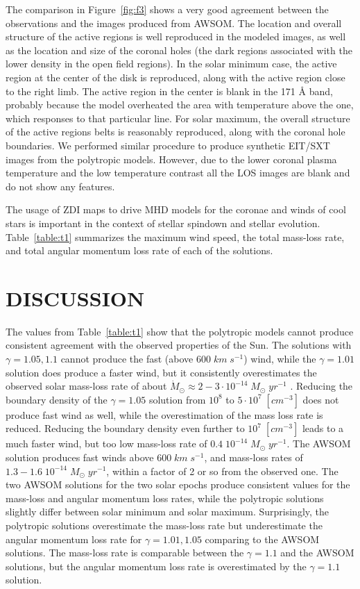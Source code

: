 \documentclass[apj]{emulateapj}
\begin{document}
The comparison in Figure~\ref{fig:f3} shows a very good agreement between the observations and the images produced from AWSOM. The location and overall structure of the active regions is well reproduced in the modeled images, as well as the location and size of the coronal holes (the dark regions associated with the lower density in the open field regions). In the solar minimum case, the active region at the center of the disk is reproduced, along with the active region close to the right limb. The active region in the center is blank in the 171 {\AA} band, probably because the model overheated the area with temperature above the one, which responses to that particular line. For solar maximum, the overall structure of the active regions belts is reasonably reproduced, along with the coronal hole boundaries. We performed similar procedure to produce synthetic EIT/SXT images from the polytropic models. However, due to the lower coronal plasma temperature and the low temperature contrast all the LOS images are blank and do not show any features.  

The usage of ZDI maps to drive MHD models for the coronae and winds of cool stars is important in the context of stellar spindown and stellar evolution. Table~\ref{table:t1} summarizes the maximum wind speed, the total mass-loss rate, and total angular momentum loss rate of each of the solutions. 

\section{DISCUSSION}
\label{sec:Discussion}

The values from Table~\ref{table:t1} show that the polytropic models cannot produce consistent agreement with the observed properties of the Sun. The solutions with $\gamma=1.05,1.1$ cannot produce the fast (above $600\;km\;s^{-1}$) wind, while the $\gamma=1.01$ solution does produce a faster wind, but it consistently overestimates the observed solar mass-loss rate of about $\dot{M}_\odot\approx 2-3\cdot 10^{-14}\;M_\odot\;yr^{-1}$ \citep{Cohen11}. 
Reducing the boundary density of the $\gamma=1.05$ solution from $10^8$ to $5\cdot 10^7\;[cm^{-3}]$ does not produce fast wind as well, while the overestimation of the mass loss rate is reduced. Reducing the boundary density even further to $10^7\;[cm^{-3}]$ leads to a much faster wind, but too low mass-loss rate of $0.4\;10^{-14}\;M_\odot\;yr^{-1}$. The AWSOM solution produces fast winds above $600\;km\;s^{-1}$, and mass-loss rates of $1.3-1.6\;10^{-14}\;M_\odot\;yr^{-1}$, within a factor of 2 or so from the observed one. The two AWSOM solutions for the two solar epochs produce consistent values for the mass-loss and angular momentum loss rates, while the polytropic solutions slightly differ between solar minimum and solar maximum. Surprisingly, the polytropic solutions overestimate the mass-loss rate but underestimate the angular momentum loss rate for $\gamma=1.01,1.05$ comparing to the AWSOM solutions. The mass-loss rate is comparable between the $\gamma=1.1$ and the AWSOM solutions, but the angular momentum loss rate is overestimated by the $\gamma=1.1$ solution. 
\end{document}
